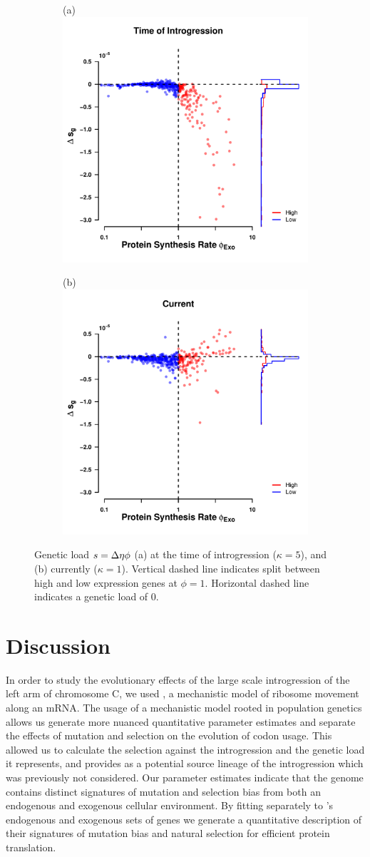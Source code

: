 \documentclass[fleqn,letterpaper]{article}
\begin{document}
\begin{figure}
    \centering
    \begin{subfigure}
        \centering
        (a) \includegraphics[width=.45\textwidth]{img/fitness_difference_gos_kappa5.pdf}
    \end{subfigure}
    \begin{subfigure}
        \centering
        (b) \includegraphics[width=.45\textwidth]{img/fitness_difference_exo.pdf}
    \end{subfigure}
    \caption{Genetic load $s = {\Delta \eta} \phi$ (a) at the time of introgression ($\kappa = 5$), and (b) currently ($\kappa = 1$). 
        Vertical dashed line indicates split between high and low expression genes at $\phi = 1$.
    	Horizontal dashed line indicates a genetic load of 0.}
    \label{fig:sne_fitness_burden}
\end{figure}


\section*{Discussion}

In order to study the evolutionary effects of the large scale introgression of the left arm of chromosome C, we used \ROC, a mechanistic model of ribosome movement along an mRNA.
The usage of a mechanistic model rooted in population genetics allows us generate more nuanced quantitative parameter estimates and separate the effects of mutation and selection on the evolution of codon usage.
This allowed us to calculate the selection against the introgression and the genetic load it represents, and provides \gossypii as a potential source lineage of the introgression which was previously not considered.
Our parameter estimates indicate that the \kluyveri genome contains distinct signatures of mutation and selection bias from both an endogenous and exogenous cellular environment.
By fitting \ROC separately to \kluyveri's endogenous and exogenous sets of genes we generate a quantitative description of their signatures of mutation bias and natural selection for efficient protein translation.
\end{document}
